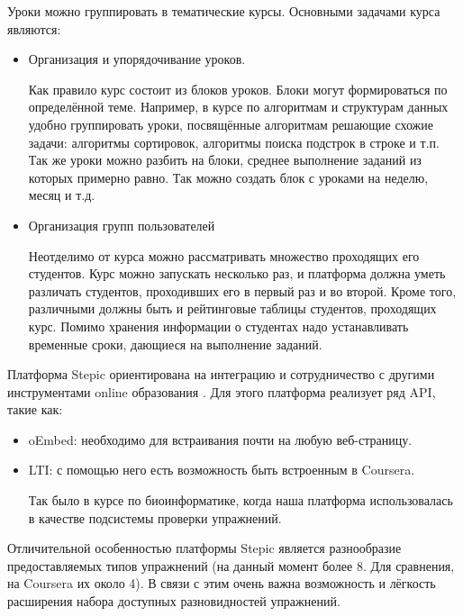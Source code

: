 \documentclass{matmex-diploma-custom}
\begin{document}
Уроки можно группировать в тематические курсы. Основными задачами
курса являются:
\begin{itemize}
\item Организация и упорядочивание уроков.

  Как правило курс состоит из блоков уроков. Блоки могут формироваться
  по определённой теме. Например, в курсе по алгоритмам и структурам
  данных удобно группировать уроки, посвящённые алгоритмам решающие
  схожие задачи: алгоритмы сортировок, алгоритмы поиска подстрок в
  строке и т.п. Так же уроки можно разбить на блоки, среднее
  выполнение заданий из которых примерно равно. Так можно создать блок
  с уроками на неделю, месяц и т.д.
\item Организация групп пользователей

  Неотделимо от курса можно рассматривать множество проходящих его
  студентов. Курс можно запускать несколько раз, и платформа должна
  уметь различать студентов, проходивших его в первый раз и во
  второй. Кроме того, различными должны быть и рейтинговые таблицы
  студентов, проходящих курс. Помимо хранения информации о студентах
  надо устанавливать временные сроки, дающиеся на выполнение заданий.
\end{itemize}

Платформа Stepic ориентирована на интеграцию и сотрудничество с
другими инструментами online образования \cite{dagger2007service}. Для
этого платформа реализует ряд API, такие как:
\begin{itemize}
\item oEmbed: необходимо для встраивания почти на любую веб-страницу.
\item LTI: с помощью него есть возможность быть встроенным в Coursera.

  Так было в курсе по биоинформатике, когда наша платформа
  использовалась в качестве подсистемы проверки упражнений.
\end{itemize}

Отличительной особенностью платформы Stepic является разнообразие
предоставляемых типов упражнений (на данный момент более 8. Для
сравнения, на Coursera их около 4).  В связи с этим очень важна
возможность и лёгкость расширения набора доступных разновидностей
упражнений.
\end{document}
